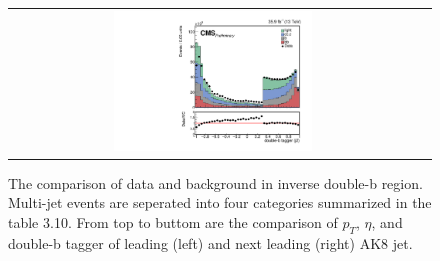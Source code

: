 \begin{figure}[t]
\begin{tabular}{cc}
    \includegraphics[width=0.5\textwidth]{Figures/dataMC_trig_antiDBT/doubleSV_j1.pdf} \\
  \end{tabular}
  \caption{The comparison of data and background in inverse double-b region. Multi-jet events are seperated into four categories summarized in the table 3.10. From top to buttom are the comparison of $p_{T}$, $\eta $, and double-b tagger of leading (left) and next leading (right) AK8 jet.}
  \label{fig:hvt_brs}
\end{figure}
